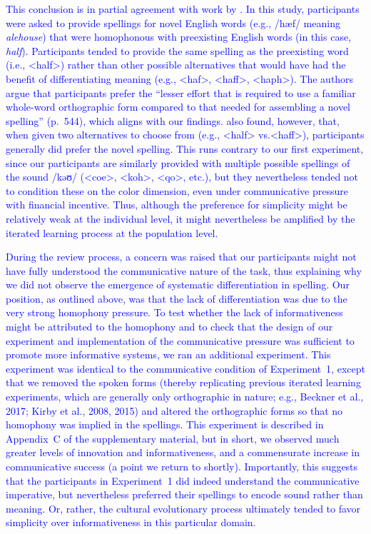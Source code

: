 \documentclass[doc,biblatex]{apa7}
\newcommand\newmaterial[1]{\textcolor{blue}{#1}}
\begin{document}
\newmaterial{This conclusion is in partial agreement with work by \textcite{Treiman:2015}. In this study, participants were asked to provide spellings for novel English words (e.g., /hæf/ meaning \textit{alehouse}) that were homophonous with preexisting English words (in this case, \textit{half}). Participants tended to provide the same spelling as the preexisting word (i.e., <half>) rather than other possible alternatives that would have had the benefit of differentiating meaning (e.g., <haf>, <haff>, <haph>). The authors argue that participants prefer the ``lesser effort that is required to use a familiar whole-word orthographic form compared to that needed for assembling a novel spelling'' (p.~544), which aligns with our findings. \textcite{Treiman:2015} also found, however, that, when given two alternatives to choose from (e.g., <half> vs.\@ <haff>), participants generally did prefer the novel spelling. This runs contrary to our first experiment, since our participants are similarly provided with multiple possible spellings of the sound /kəʊ/ (<coe>, <koh>, <qo>, etc.), but they nevertheless tended not to condition these on the color dimension, even under communicative pressure with financial incentive. Thus, although the preference for simplicity might be relatively weak at the individual level, it might nevertheless be amplified by the iterated learning process at the population level.}

\newmaterial{During the review process, a concern was raised that our participants might not have fully understood the communicative nature of the task, thus explaining why we did not observe the emergence of systematic differentiation in spelling. Our position, as outlined above, was that the lack of differentiation was due to the very strong homophony pressure. To test whether the lack of informativeness might be attributed to the homophony and to check that the design of our experiment and implementation of the communicative pressure was sufficient to promote more informative systems, we ran an additional experiment. This experiment was identical to the communicative condition of Experiment~1, except that we removed the spoken forms (thereby replicating previous iterated learning experiments, which are generally only orthographic in nature; e.g., Beckner et al., 2017; Kirby et al., 2008, 2015) and altered the orthographic forms so that no homophony was implied in the spellings. This experiment is described in Appendix~C of the supplementary material, but in short, we observed much greater levels of innovation and informativeness, and a commensurate increase in communicative success (a point we return to shortly). Importantly, this suggests that the participants in Experiment~1 did indeed understand the communicative imperative, but nevertheless preferred their spellings to encode sound rather than meaning. Or, rather, the cultural evolutionary process ultimately tended to favor simplicity over informativeness in this particular domain.}
\end{document}
